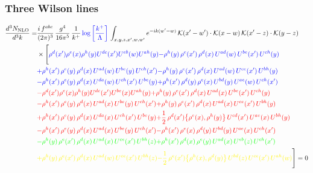 \documentclass[9pt]{article}
\numberwithin{equation}{section}
\begin{document}
\subsubsection{Three Wilson lines}
\begin{align}
    \frac{d^{3}N_{\rm NLO}}{d^{3}k}= & \frac{i\,f^{abc}}{(2\pi)^{3}}\,\frac{g^{4}}{16\pi^{5}}\,\frac{1}{k^{+}}\,{\color{blue}\log{\left[\frac{k^{+}}{\Lambda}\right]}}\,\int_{x,y,z,x',w,w'}e^{-ik(w'-w)}\,\mathcal{K}(x'-w')\cdot\mathcal{K}(x-w)\,\mathcal{K}(x'-z)\cdot\mathcal{K}(y-z)\notag \\ & \times\Bigg[{\color{blue}\rho^{d}(x') \rho^{e}(x) \rho^{h}(y) U^{d c}(x') U^{e b}(w) U^{a h}(y)}{\color{blue}-\rho^{h}(y)\,\rho^{e}(x')\,\rho^{d}(x)\,U^{ad}(w)\,U^{be}(x')\,U^{ch}(y)}\notag \\
&{\color{blue}+\rho^{h}(x')\,\rho^{e}(y)\,\rho^{d}(x)\,U^{ad}(w)\,U^{be}(y)\,U^{ch}(x')}{\color{blue}-\rho^{h}(y)\,\rho^{e}(x')\,\rho^{d}(x)\,U^{ad}(w)\,U^{ce}(x')\,U^{bh}(y)} \notag \\ &{\color{blue}-\rho^{h}(x')\,\rho^{e}(y)\,\rho^{d}(x)\,U^{da}(w)\,U^{ch}(x')\,U^{be}(y)}{\color{blue}+\rho^{h}(x')\,\rho^{d}(y)\,\rho^{e}(x)\,U^{bd}(y)\,U^{ae}(w)\,U^{ch}(x')}\notag \\
&{\color{red}-\rho^{d}(x') \rho^{e}(x) \rho^{h}(y) U^{d c}(x') U^{b e}(x) U^{a h}(y)}{\color{red}+\rho^{h}(y)\,\rho^{e}(x')\,\rho^{d}(x)\,U^{ad}(x)\,U^{be}(x')\,U^{ch}(y)}\notag \\ & {\color{red}-\rho^{h}(x')\,\rho^{e}(y)\,\rho^{d}(x)\,U^{ad}(x)\,U^{be}(y)\,U^{ch}(x')} {\color{red}+\rho^{h}(y)\,\rho^{e}(x')\,\rho^{d}(x)\,U^{ad}(x)\,U^{ce}(x')\,U^{bh}(y)}\notag \\ & {\color{red}+\rho^{h}(x')\,\rho^{e}(y)\,\rho^{d}(x)\,U^{da}(x)\,U^{ch}(x')\,U^{be}(y)}{\color{red}+\frac{1}{2}\,\rho^{d}(x')\big\{\rho^{e}(x),\rho^{h}(y)\big\}\,U^{cd}(x')\,U^{ae}(x)\,U^{bh}(y)}\notag \\ & {\color{red}-\rho^{h}(x')\,\rho^{e}(y)\,\rho^{d}(x)\,U^{ad}(x)\,U^{be}(y)\,U^{ch}(x')}{\color{red}-\rho^{h}(x')\,\rho^{e}(x)\,\rho^{d}(y)\,U^{bd}(y)\,U^{ae}(x)\,U^{ch}(x')}\notag \\ & {\color{green}-\rho^{h}(y)\,\rho^{e}(x')\,\rho^{d}(x)\,U^{ad}(x)\,U^{ce}(x')\,U^{bh}(z)}{\color{green}+\rho^{h}(x')\,\rho^{d}(x)\,\rho^{e}(y)\,U^{ad}(x)\,U^{eb}(z)\,U^{ch}(x')}\notag \\ & {\color{yellow}+\rho^{h}(y)\,\rho^{e}(x')\,\rho^{d}(x)\,U^{ad}(w)\,U^{ce}(x')\,U^{bh}(z)}{\color{yellow}-\frac{1}{2}\,\rho^{e}(x')\big\{\rho^{h}(x),\rho^{d}(y)\big\}\,U^{bd}(z)\,U^{ce}(x')\,U^{ah}(w)}\Bigg] = 0
\end{align}
\end{document}
